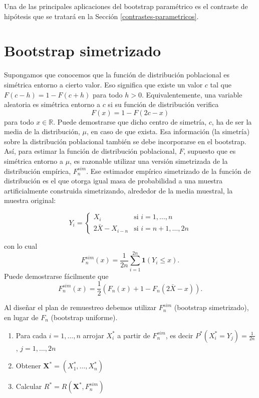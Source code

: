 \documentclass[
]{book}
\renewcommand{\mathbf}[1]{\symbf{#1}}
\theoremstyle{break}
\theoremstyle{nonumberplain}
\begin{document}
Una de las principales aplicaciones del bootstrap paramétrico
es el contraste de hipótesis que se tratará en la Sección \ref{contrastes-parametricos}.

\section{Bootstrap simetrizado}\label{bootstrap-simetrizado}

Supongamos que conocemos que la función de distribución poblacional es
simétrica entorno a cierto valor. Eso significa que existe un valor \(c\)
tal que \(F\left( c-h \right) =1-F\left( c+h \right)\) para todo \(h>0\).
Equivalentemente, una variable aleatoria es simétrica entorno a \(c\) si
su función de distribución verifica
\[F\left( x \right) = 1 - F\left( 2c - x \right)\]
para todo \(x\in \mathbb{R}\). Puede demostrarse que dicho
centro de simetría, \(c\), ha de ser la media de la distribución,
\(\mu\), en caso de que exista. Esa información (la simetría) sobre la
distribución poblacional también se debe incorporarse en el bootstrap.
Así, para estimar la función de distribución poblacional, \(F\), supuesto
que es simétrica entorno a \(\mu\), es razonable utilizar una versión
simetrizada de la distribución empírica, \(F_n^{sim}\). Ese estimador
empírico simetrizado de la función de distribución es el que otorga
igual masa de probabilidad a una muestra artificialmente construida
simetrizando, alrededor de la media muestral, la muestra original:

\[Y_i=\left\{ 
\begin{array}{ll}
X_i & \text{si } i=1,\ldots ,n \\ 
2\bar{X}-X_{i-n} &\text{si } i=n+1,\ldots ,2n
\end{array}
\right.\]

con lo cual
\[F_n^{sim}\left( x \right) =\frac{1}{2n}\sum_{i=1}^{2n}\mathbf{1}\left( Y_i\leq x \right).\]
Puede demostrarse fácilmente que
\[F_n^{sim}\left( x \right) =\frac{1}{2}\left( F_n\left( x \right)
+1-F_n\left( 2\bar{X}-x \right) \right).\]

Al diseñar el plan de remuestreo debemos utilizar \(F_n^{sim}\)
(bootstrap simetrizado), en lugar de \(F_n\) (bootstrap uniforme).

\begin{enumerate}
\def\labelenumi{\arabic{enumi}.}
\item
  Para cada \(i=1,\ldots ,n\) arrojar \(X_i^{\ast}\) a partir de
  \(F_n^{sim}\), es decir
  \(P^{\ast}\left( X_i^{\ast}=Y_j \right) =\frac{1
  }{2n}\), \(j=1,\ldots ,2n\)
\item
  Obtener \(\mathbf{X}^{\ast}=\left( X_1^{\ast},\ldots
  ,X_n^{\ast} \right)\)
\item
  Calcular
  \(R^{\ast}=R\left( \mathbf{X}^{\ast},F_n^{sim} \right)\)
\end{enumerate}
\end{document}
